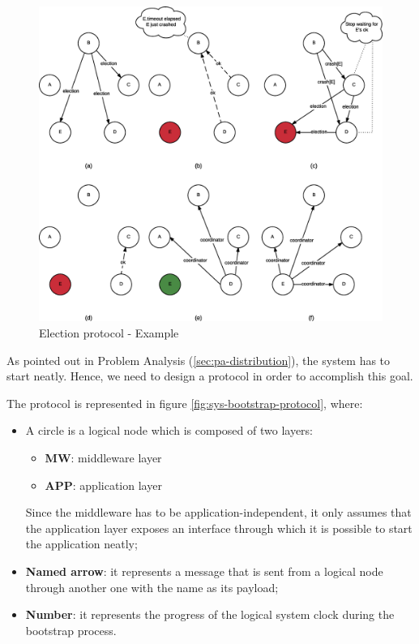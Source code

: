 \begin{figure}[H]
  \centering
  \includegraphics[width=\columnwidth]{sections/images/solution/election.eps}
  \caption{Election protocol - Example}
  \label{fig:election-protocol-ex}
\end{figure}

As pointed out in Problem Analysis (\ref{sec:pa-distribution}), the system has
to start neatly. Hence, we need to design a protocol in order to accomplish 
this goal.

The protocol is represented in figure \ref{fig:sys-bootstrap-protocol}, where:

\begin{itemize}
  \item A circle is a logical node which is composed of two layers:
    \begin{itemize}
      \item \textbf{MW}:  middleware layer
      \item \textbf{APP}: application layer
  \end{itemize}
    Since the middleware has to be application-independent, it only assumes 
    that the application layer exposes an interface through which it is 
    possible to start the application neatly;
  \item \textbf{Named arrow}: it represents a message that is sent from a 
logical node through another one with the name as its payload;
  \item \textbf{Number}: it represents the progress of the logical system clock 
during the bootstrap process.
\end{itemize}

